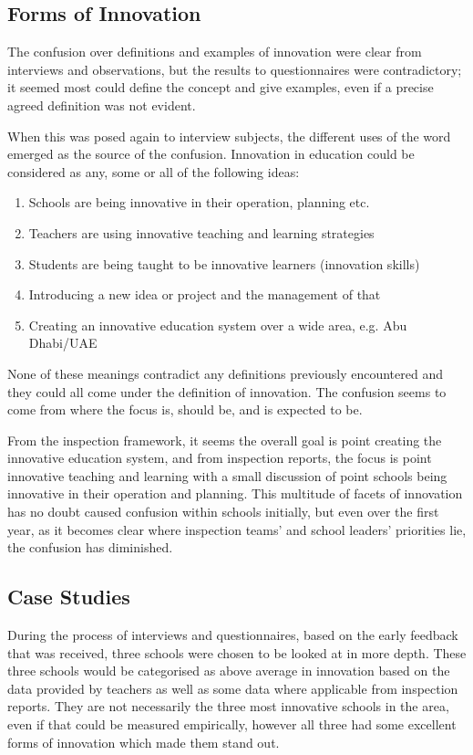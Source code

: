 \subsection{Forms of Innovation}

The confusion over definitions and examples of innovation were clear from interviews and observations, but the results to questionnaires were contradictory; it seemed most could define the concept and give examples, even if a precise agreed definition was not evident.

When this was posed again to interview subjects, the different uses of the word emerged as the source of the confusion.
Innovation in education could be considered as any, some or all of the following ideas:
\begin{enumerate}
\item Schools are being innovative in their operation, planning etc.
\item Teachers are using innovative teaching and learning strategies 
\item Students are being taught to be innovative learners (innovation skills)
\item Introducing a new idea or project and the management of that
\item Creating an innovative education system over a wide area, e.g. Abu Dhabi/UAE
\end{enumerate}
None of these meanings contradict any definitions previously encountered and they could all come under the definition of innovation. The confusion seems to come from where the focus is, should be, and is expected to be. 

From the inspection framework, it seems the overall goal is point creating the innovative education system, and from inspection reports, the focus is point innovative teaching and learning with a small discussion of point schools being innovative in their operation and planning. This multitude of facets of innovation has no doubt caused confusion within schools initially, but even over the first year, as it becomes clear where inspection teams’ and school leaders’ priorities lie, the confusion has diminished.

\subsection{Case Studies}
During the process of interviews and questionnaires, based on the early feedback that was received, three schools were chosen to be looked at in more depth. These three schools would be categorised as above average in innovation based on the data provided by teachers as well as some data where applicable from inspection reports. They are not necessarily the three most innovative schools in the area, even if that could be measured empirically, however all three had some excellent forms of innovation which made them stand out.

